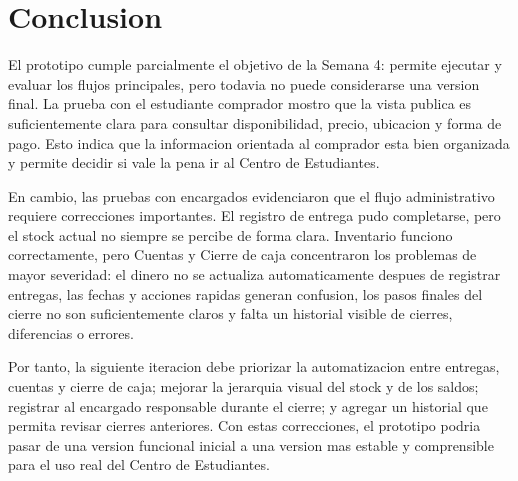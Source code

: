 \documentclass[12pt,letterpaper]{article}
\begin{document}
\clearpage
\section{Conclusion}

El prototipo cumple parcialmente el objetivo de la Semana 4: permite ejecutar y evaluar los flujos principales, pero todavia no puede considerarse una version final. La prueba con el estudiante comprador mostro que la vista publica es suficientemente clara para consultar disponibilidad, precio, ubicacion y forma de pago. Esto indica que la informacion orientada al comprador esta bien organizada y permite decidir si vale la pena ir al Centro de Estudiantes.

En cambio, las pruebas con encargados evidenciaron que el flujo administrativo requiere correcciones importantes. El registro de entrega pudo completarse, pero el stock actual no siempre se percibe de forma clara. Inventario funciono correctamente, pero Cuentas y Cierre de caja concentraron los problemas de mayor severidad: el dinero no se actualiza automaticamente despues de registrar entregas, las fechas y acciones rapidas generan confusion, los pasos finales del cierre no son suficientemente claros y falta un historial visible de cierres, diferencias o errores.

Por tanto, la siguiente iteracion debe priorizar la automatizacion entre entregas, cuentas y cierre de caja; mejorar la jerarquia visual del stock y de los saldos; registrar al encargado responsable durante el cierre; y agregar un historial que permita revisar cierres anteriores. Con estas correcciones, el prototipo podria pasar de una version funcional inicial a una version mas estable y comprensible para el uso real del Centro de Estudiantes.
\end{document}
